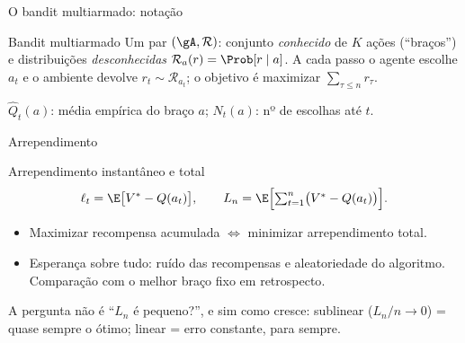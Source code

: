 \documentclass[aspectratio=169, 11pt]{beamer}
\newcommand{\Qh}{\widehat{Q}}
\newcommand{\Dist}{\mathcal{R}}
\begin{document}
\begin{frame}{O bandit multiarmado: notação}
  \begin{defbox}{Bandit multiarmado}
    {\small Um par $(\gA,\Dist)$: conjunto \emph{conhecido} de $K$ ações
    (``braços'') e distribuições \emph{desconhecidas}
    $\Dist_a(r) = \Prob[r\mid a]$. A cada passo o agente escolhe $a_t$ e o
    ambiente devolve $r_t \sim \Dist_{a_t}$; o objetivo é maximizar
    $\sum_{\tau\le n} r_\tau$.}
  \end{defbox}

  \begin{center}
  \end{center}

  {\small $\Qh_t(a)$: média empírica do braço $a$; $N_t(a)$: nº de escolhas
  até $t$.}
\end{frame}

\begin{frame}{Arrependimento}
  \begin{defbox}{Arrependimento instantâneo e total}
    \[
      \ell_t = \E\bigl[V^{*}-Q(a_t)\bigr],
      \qquad
      L_n = \E\Bigl[\textstyle\sum_{t=1}^{n}\bigl(V^{*}-Q(a_t)\bigr)\Bigr].
    \]
  \end{defbox}

  \begin{itemize}\small
    \item Maximizar recompensa acumulada $\iff$ minimizar arrependimento total.
    \item Esperança sobre tudo: ruído das recompensas e aleatoriedade do
          algoritmo. Comparação com o \alert{melhor braço fixo em
          retrospecto}.
  \end{itemize}

  \begin{ideiabox}
    A pergunta não é ``$L_n$ é pequeno?'', e sim \alert{como} cresce:
    sublinear ($L_n/n\to0$) = quase sempre o ótimo; linear = erro constante,
    para sempre.
  \end{ideiabox}
\end{frame}
\end{document}
